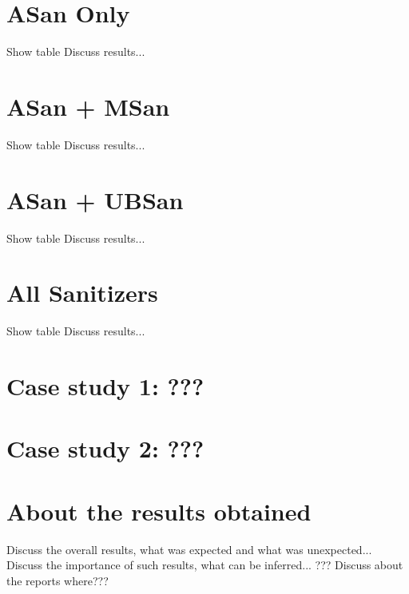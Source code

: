 \documentclass[Lau,oneside]{sapthesis}%
\begin{document}
\newpage
\section{ASan Only}
Show table
\newline \newline
Discuss results...

\newpage
\section{ASan + MSan}
Show table
\newline \newline
Discuss results...

\newpage
\section{ASan + UBSan}
Show table
\newline \newline
Discuss results...

\newpage
\section{All Sanitizers}
Show table
\newline \newline
Discuss results...


\newpage
\section{Case study 1: ???}


\newpage
\section{Case study 2: ???}


\newpage
\section{About the results obtained}
Discuss the overall results, what was expected and what was unexpected...
\newline \newline
Discuss the importance of such results, what can be inferred...
\newline \newline
??? Discuss about the reports  where???
\end{document}
